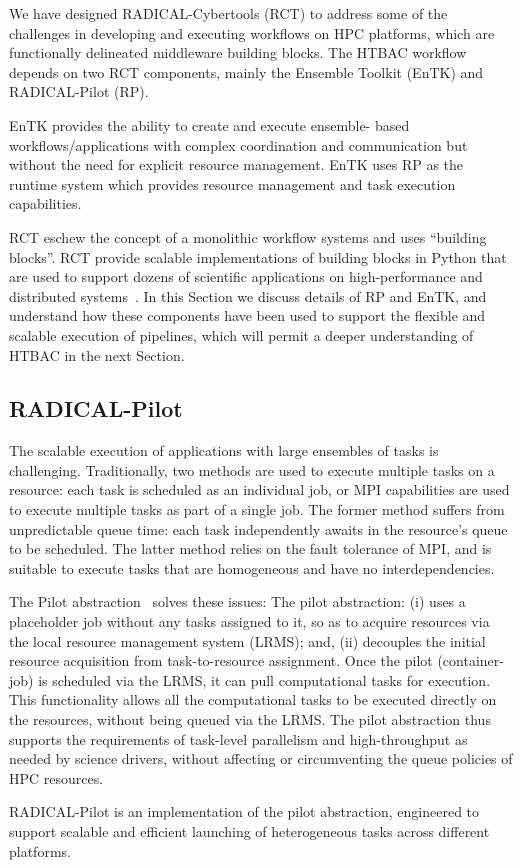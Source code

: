 We have designed RADICAL-Cybertools (RCT) to address some of the challenges
in developing and executing workflows on HPC platforms, which are
functionally delineated middleware building blocks. The HTBAC workflow
 depends on two RCT components, mainly the
Ensemble Toolkit (EnTK) and RADICAL-Pilot (RP).

EnTK provides the ability to create and execute ensemble- based
workflows/applications with complex coordination and communication but
without the need for explicit resource management. EnTK uses RP as the
runtime system which provides resource management and task execution
capabilities.

RCT eschew the concept of a monolithic workflow systems and uses ``building
blocks''. RCT provide scalable implementations of building blocks in Python
that are used to support dozens of scientific applications on 
high-performance and distributed systems~\cite{turilli2016analysis, angius2017converging,treikalis2016repex, balasubramanian2016ensemble, balasubramanian2016extasy}. 
In this Section we discuss details of RP and EnTK, and understand how these
components have been used to support the flexible and scalable execution of
pipelines, which will permit a deeper understanding of HTBAC in the next
Section.

\subsection{RADICAL-Pilot}

The scalable execution of applications with large ensembles of tasks is
challenging. Traditionally, two methods are used to execute multiple tasks on
a resource: each task is scheduled as an individual job, or MPI capabilities
are used to execute multiple tasks as part of a single job. The former method
suffers from unpredictable queue time: each task independently awaits in the
resource's queue to be scheduled. The latter method relies on the fault
tolerance of MPI, and is suitable to execute tasks that are homogeneous and
have no interdependencies.

The Pilot abstraction~\cite{turilli2017comprehensive} solves these issues:
The pilot abstraction: (i) uses a placeholder job without any tasks assigned
to it, so as to acquire resources via the local resource management system
(LRMS); and, (ii) decouples the initial resource acquisition from
task-to-resource assignment. Once the pilot (container-job) is scheduled via
the LRMS, it can pull computational tasks for execution. This functionality
allows all the computational tasks to be executed directly on the resources,
without being queued via the LRMS\@. %
The pilot abstraction thus supports the requirements of task-level
parallelism and high-throughput as needed by science drivers, without
affecting or circumventing the queue policies of HPC resources.

RADICAL-Pilot is an implementation of the pilot abstraction, engineered to
support scalable and efficient launching of heterogeneous tasks across
different platforms.